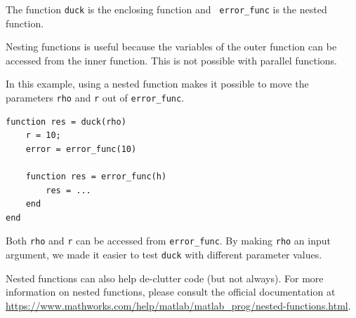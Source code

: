 \documentclass[
]{book}
\begin{document}
\begin{appendices}
The function {\tt duck} is the enclosing function and {\tt
error\_func} is the nested function.

Nesting functions is useful because the variables of the outer
function can be accessed from the inner function.  This is not
possible with parallel functions.

In this example, using a nested function makes it possible to
move the parameters {\tt rho} and {\tt r} out of {\tt error\_func}.

\begin{verbatim}
function res = duck(rho)
    r = 10;
    error = error_func(10)

    function res = error_func(h)
        res = ...
    end
end
\end{verbatim}

Both {\tt rho} and {\tt r} can be accessed from {\tt error\_func}.
By making {\tt rho} an input argument, we made it easier to test
{\tt duck} with different parameter values.

Nested functions can also help de-clutter code (but not always). For
more information on nested functions, please consult the official documentation
at \url{https://www.mathworks.com/help/matlab/matlab_prog/nested-functions.html}.

\end{appendices}

\printindex
\end{document}
